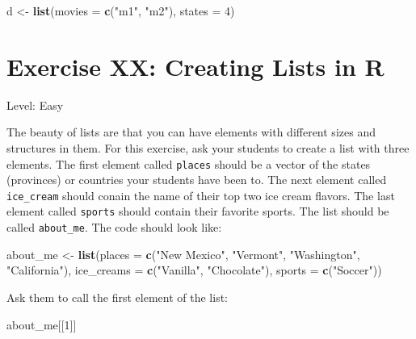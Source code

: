 \documentclass[]{book}
\newenvironment{Shaded}{\begin{snugshade}}{\end{snugshade}}
\newcommand{\DataTypeTok}[1]{\textcolor[rgb]{0.13,0.29,0.53}{#1}}
\newcommand{\DecValTok}[1]{\textcolor[rgb]{0.00,0.00,0.81}{#1}}
\newcommand{\KeywordTok}[1]{\textcolor[rgb]{0.13,0.29,0.53}{\textbf{#1}}}
\newcommand{\NormalTok}[1]{#1}
\newcommand{\StringTok}[1]{\textcolor[rgb]{0.31,0.60,0.02}{#1}}
\begin{document}
\begin{Shaded}
\begin{Highlighting}[]
\NormalTok{d <-}\StringTok{ }\KeywordTok{list}\NormalTok{(}\DataTypeTok{movies =} \KeywordTok{c}\NormalTok{(}\StringTok{"m1"}\NormalTok{, }\StringTok{"m2"}\NormalTok{),}
     \DataTypeTok{states =} \DecValTok{4}\NormalTok{)}
\end{Highlighting}
\end{Shaded}

\hypertarget{exercise-xx-creating-lists-in-r}{%
\section*{Exercise XX: Creating Lists in R}\label{exercise-xx-creating-lists-in-r}}

Level: Easy

The beauty of lists are that you can have elements with different sizes and structures in them. For this exercise, ask your students to create a list with three elements. The first element called \texttt{places} should be a vector of the states (provinces) or countries your students have been to. The next element called \texttt{ice\_cream} should conain the name of their top two ice cream flavors. The last element called \texttt{sports} should contain their favorite sports. The list should be called \texttt{about\_me}. The code should look like:

\begin{Shaded}
\begin{Highlighting}[]
\NormalTok{about_me <-}\StringTok{ }\KeywordTok{list}\NormalTok{(}\DataTypeTok{places =} \KeywordTok{c}\NormalTok{(}\StringTok{"New Mexico"}\NormalTok{, }\StringTok{"Vermont"}\NormalTok{, }\StringTok{"Washington"}\NormalTok{, }\StringTok{"California"}\NormalTok{),}
                 \DataTypeTok{ice_creams =} \KeywordTok{c}\NormalTok{(}\StringTok{"Vanilla"}\NormalTok{, }\StringTok{"Chocolate"}\NormalTok{),}
                 \DataTypeTok{sports =} \KeywordTok{c}\NormalTok{(}\StringTok{"Soccer"}\NormalTok{))}
\end{Highlighting}
\end{Shaded}

Ask them to call the first element of the list:

\begin{Shaded}
\begin{Highlighting}[]
\NormalTok{about_me[[}\DecValTok{1}\NormalTok{]]}
\end{Highlighting}
\end{Shaded}
\end{document}
